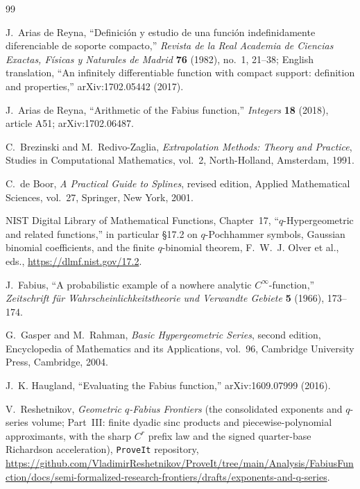 \documentclass[11pt,oneside]{article}
\theoremstyle{plain}
\theoremstyle{definition}
\theoremstyle{remark}
\begin{document}
\clearpage
\begin{thebibliography}{99}

J.~Arias de Reyna,
``Definici\'on y estudio de una funci\'on indefinidamente diferenciable de
soporte compacto,''
\emph{Revista de la Real Academia de Ciencias Exactas, F\'isicas y Naturales
de Madrid} \textbf{76} (1982), no.~1, 21--38;
English translation, ``An infinitely differentiable function with compact
support: definition and properties,'' arXiv:1702.05442 (2017).

J.~Arias de Reyna,
``Arithmetic of the Fabius function,''
\emph{Integers} \textbf{18} (2018), article A51;
arXiv:1702.06487.

C.~Brezinski and M.~Redivo-Zaglia,
\emph{Extrapolation Methods: Theory and Practice},
Studies in Computational Mathematics, vol.~2, North-Holland, Amsterdam, 1991.

C.~de Boor,
\emph{A Practical Guide to Splines}, revised edition,
Applied Mathematical Sciences, vol.~27, Springer, New York, 2001.

NIST Digital Library of Mathematical Functions,
Chapter~17, ``\(q\)-Hypergeometric and related functions,'' in particular
\S17.2 on \(q\)-Pochhammer symbols, Gaussian binomial coefficients, and the
finite \(q\)-binomial theorem,
F.~W.~J. Olver et al., eds., \url{https://dlmf.nist.gov/17.2}.

J.~Fabius,
``A probabilistic example of a nowhere analytic \(C^{\infty}\)-function,''
\emph{Zeitschrift f\"ur Wahrscheinlichkeitstheorie und Verwandte Gebiete}
\textbf{5} (1966), 173--174.

G.~Gasper and M.~Rahman,
\emph{Basic Hypergeometric Series}, second edition,
Encyclopedia of Mathematics and its Applications, vol.~96,
Cambridge University Press, Cambridge, 2004.

J.~K. Haugland,
``Evaluating the Fabius function,''
arXiv:1609.07999 (2016).

V.~Reshetnikov,
\emph{Geometric \(q\)-Fabius Frontiers} (the consolidated exponents and
\(q\)-series volume; Part~III: finite dyadic sinc products and
piecewise-polynomial approximants, with the sharp \(C^{r}\) prefix law and the
signed quarter-base Richardson acceleration),
\texttt{ProveIt} repository,
\url{https://github.com/VladimirReshetnikov/ProveIt/tree/main/Analysis/FabiusFunction/docs/semi-formalized-research-frontiers/drafts/exponents-and-q-series}.


\end{thebibliography}
\end{document}
